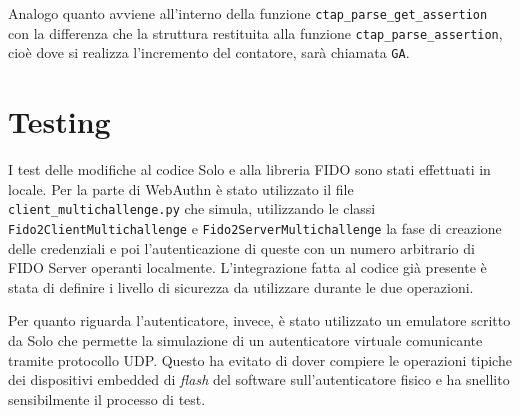 Analogo quanto avviene all'interno della funzione \verb*|ctap_parse_get_assertion| con la differenza che la struttura restituita alla funzione \verb*|ctap_parse_assertion|, cioè dove si realizza l'incremento del contatore, sarà chiamata \verb*|GA|.


\section{Testing}
\label{testing}

I test delle modifiche al codice Solo e alla libreria FIDO sono stati effettuati in locale. Per la parte di WebAuthn è stato utilizzato il file \verb*|client_multichallenge.py| che simula, utilizzando le classi \verb*|Fido2ClientMultichallenge| e \verb*|Fido2ServerMultichallenge| la fase di creazione delle credenziali e poi l'autenticazione di queste con un numero arbitrario di FIDO Server operanti localmente. 
L'integrazione fatta al codice già presente è stata di definire i livello di sicurezza da utilizzare durante le due operazioni. 

Per quanto riguarda l'autenticatore, invece, è stato utilizzato un emulatore scritto da Solo che permette la simulazione di un autenticatore virtuale comunicante tramite protocollo UDP. Questo ha evitato di dover compiere le operazioni tipiche dei dispositivi embedded di \emph{flash} del software sull'autenticatore fisico e ha snellito sensibilmente il processo di test. 

